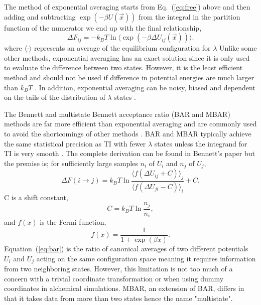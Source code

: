\documentclass[fleqn,10pt,lineno]{wlpeerj} %
\begin{document}
The method of exponential averaging \citep{Zwanzig1954} starts from Eq.\ (\ref{eq:free}) above and then adding and subtracting $\exp{(-\beta U(\vec{x}))}$ from the integral in the partition function of the numerator we end up with the final relationship,
\begin{equation}\label{eq:exp}
    \Delta F_{ij} = -k_{B}T \ln \langle \exp{(-\beta \Delta U_{ij}(\vec{x}))} \rangle.
\end{equation}
where $\langle\cdot\rangle$ represents an average of the equilibrium configuration for $\lambda$
Unlike some other methods, exponential averaging has an exact solution since it is only used to evaluate the difference between two states. However, it is the least efficient method and should not be used if difference in potential energies are much larger than $k_{B}T$ \cite{Shirts2005}.
In addition, exponential averaging can be noisy, biased and dependent on the tails of the distribution of $\lambda$ states \citep{Bruckner2011,Shirts2005}.

The Bennett \citep{Bennett1976} and multistate \citep{Shirts2008} Bennett acceptance ratio (BAR and MBAR) methods are far more efficient than exponential averaging and are commonly used to avoid the shortcomings of other methods \citep{Shirts2005, Ytreberg2006}. BAR and MBAR typically achieve the same statistical precision as TI with fewer $\lambda$ states unless the integrand for TI is very smooth \citep{Monticelli2013, Ytreberg2006}. The complete derivation can be found in Bennett's paper \citep{Bennett1976} but the premise is; for sufficiently large samples $n_{i}$ of $U_{i}$ and $n_{j}$ of $U_{j}$,
\begin{equation}\label{eq:bar}
    \Delta F(i \rightarrow j) = k_{B}T \ln{\frac{\langle f(\Delta U_{ij} + C) \rangle_{j}}{\langle f(\Delta U_{ji} - C) \rangle_{i}}} + C.
\end{equation}
C is a shift constant,
\begin{equation}\label{eq:barc}
    C = k_{B}T\ln{\frac{n_{j}}{n_{i}}},
\end{equation} 
and $f(x)$ is the Fermi function,
\begin{equation}\label{eq:fermi}
    f(x) = \frac{1}{1 + \exp(\beta x)}. 
\end{equation}
Equation\ (\ref{eq:bar}) is the ratio of canonical averages of two different potentials $U_{i}$ and $U_{j}$ acting on the same configuration space meaning it requires information from two neighboring states. However, this limitation is not too much of a concern with a trivial coordinate transformation or when using dummy coordinates in alchemical simulations. MBAR, an extension of BAR, differs in that it takes data from more than two states hence the name "multistate".
\end{document}
